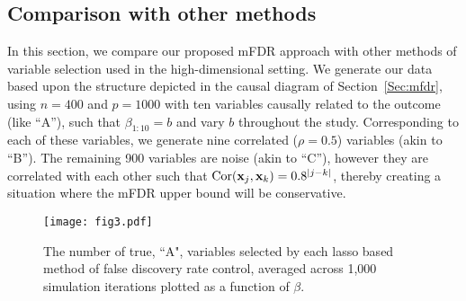 \subsection{Comparison with other methods}
\label{Sec:sim-comp}

In this section, we compare our proposed mFDR approach with other methods of variable selection used in the high-dimensional setting. We generate our data based upon the structure depicted in the causal diagram of Section~\ref{Sec:mfdr}, using $n = 400$ and $p = 1000$ with ten variables causally related to the outcome (like ``A''), such that $\beta_{1:10} = b$ and vary $b$ throughout the study. Corresponding to each of these variables, we generate nine correlated ($\rho = 0.5$) variables (akin to ``B''). The remaining 900 variables are noise (akin to ``C''), however they are correlated with each other such that $\textrm{Cor}(\mathbf{x}_j,\mathbf{x}_k) = 0.8^{|j - k|}$, thereby creating a situation where the mFDR upper bound will be conservative.

\begin{figure} [htb!]
 \centering
  \texttt{[image: fig3.pdf]}
  \caption{\label{Fig:lassopower} The number of true, ``A", variables selected by each lasso based method of false discovery rate control, averaged across 1,000 simulation iterations plotted as a function of $\beta$.}
\end{figure}


